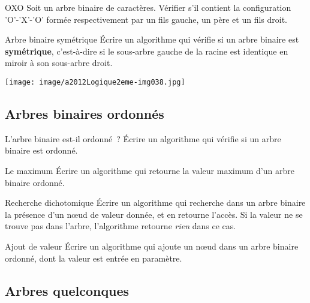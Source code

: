 		\begin{Exercice}{OXO}
			Soit un arbre binaire de caractères. Vérifier s'il contient 
			la configuration 'O'-'X'-'O' formée respectivement par un
			fils gauche, un père et un fils droit.
		\end{Exercice}

		\begin{Exercice}{Arbre binaire symétrique}
			Écrire un algorithme qui vérifie si un arbre binaire est 
			\textbf{symétrique}, c'est-à-dire si le sous-arbre gauche de la
			racine est identique en miroir à son sous-arbre droit.

			\begin{center}
			\texttt{[image: image/a2012Logique2eme-img038.jpg]}
			\end{center}
		\end{Exercice}
		
	\subsection{Arbres binaires ordonnés}

		\begin{Exercice}{L'arbre binaire est-il ordonné~?}
			Écrire un algorithme qui vérifie si un arbre binaire est ordonné.
		\end{Exercice}
		
		\begin{Exercice}{Le maximum}
			Écrire un algorithme qui retourne la valeur maximum d'un arbre 
			binaire ordonné.
		\end{Exercice}
		
		\begin{Exercice}{Recherche dichotomique}
			Écrire un algorithme qui recherche dans un arbre binaire la 
			présence d'un n{\oe}ud de valeur donnée, et en retourne
			l'accès. Si la valeur ne se trouve pas dans l'arbre, 
			l'algorithme retourne \textit{rien} dans ce cas.
		\end{Exercice}
		
		\begin{Exercice}{Ajout de valeur}
			Écrire un algorithme qui ajoute un n{\oe}ud dans un arbre 
			binaire ordonné, dont la valeur est entrée en paramètre.
		\end{Exercice}
		
	\subsection{Arbres quelconques}
			
